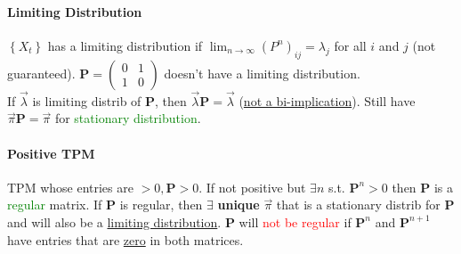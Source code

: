 \documentclass[10pt,landscape]{article}
\begin{document}
\begin{multicols*}{3}
\paragraph{Limiting Distribution} $\left\{X_t\right\}$ has a limiting
distribution if $\lim_{n\to \infty}(P^n)_{ij} = \lambda_j$ for all $i$
and $j$ (not guaranteed). $\mathbf{P} =
\begin{pmatrix}
  0 & 1 \\ 1 & 0
\end{pmatrix}
$ doesn't have a limiting distribution.
\\ If $\vec{\lambda}$ is limiting distrib of $\mathbf{P}$, then
$\vec{\lambda}\mathbf{P} = \vec{\lambda}$ (\underline{not a
  bi-implication}). Still have $\vec{\pi}\mathbf{P} = \vec{\pi}$ for
\textcolor{green}{stationary distribution}.
\paragraph{Positive TPM} TPM whose entries are $>0, \mathbf{P} >
0$. If not positive but $\exists n$ s.t. $\mathbf{P}^n >0$ then
$\mathbf{P}$ is a \textcolor{green}{regular} matrix. If $\mathbf{P}$ is
regular, then $\exists$ \textbf{unique} $\vec{\pi}$ that is a
stationary distrib for $\mathbf{P}$ and will also be a \underline{limiting
distribution}. $\mathbf{P}$ will \textcolor{red}{not be regular} if
$\mathbf{P}^n$ and $\mathbf{P}^{n+1}$ have entries that are
\underline{zero} in both matrices.

\end{multicols*}
\end{document}

